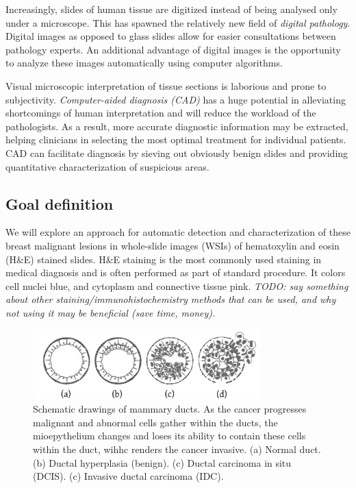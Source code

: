 \documentclass[journal]{IEEEtran}
\begin{document}
Increasingly, slides of human tissue are digitized instead of being analysed only under a microscope. This has spawned the relatively new field of \emph{digital pathology}. Digital images as opposed to glass slides allow for  easier consultations between pathology experts. An additional advantage of digital images is the opportunity to analyze these images automatically using computer algorithms.

Visual microscopic interpretation of tissue sections is laborious and prone to subjectivity. \emph{Computer-aided diagnosis (CAD)} has a huge potential in alleviating shortcomings of human interpretation and will reduce the workload of the pathologists. As a result, more accurate diagnostic information may be extracted, helping clinicians in selecting the most optimal treatment for individual patients. CAD can facilitate diagnosis by sieving out obviously benign slides and providing quantitative characterization of suspicious areas.


\subsection{Goal definition}

We will explore an approach for automatic detection and characterization of these breast malignant lesions in whole-slide images (WSIs) of hematoxylin and eosin (H\&E) stained slides. H\&E staining is the most commonly used staining in medical diagnosis and is often performed as part of standard procedure. It colors cell nuclei blue, and cytoplasm and connective tissue pink. \textit{TODO: say something about other staining/immunohistochemistry methods that can be used, and why not using it may be beneficial (save time, money).}

\begin{figure}[!t]
\centering{}
\includegraphics[width=3.45in]{lesinos_diagrams.png}
\vspace{-0.38cm}\caption{Schematic drawings of mammary ducts. As the cancer progresses malignant and abnormal cells gather within the ducts, the mioepythelium changes and loses its ability to contain these cells within the duct, wihhc renders the cancer invasive. (a) Normal duct. (b) Ductal hyperplasia (benign). (c) Ductal carcinoma in situ (DCIS). (c) Invasive ductal carcinoma (IDC). }
\label{fig_diagrams}
\end{figure}
\end{document}
